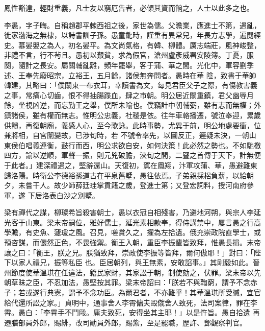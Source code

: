 \begin{pinyinscope}
 鳳性豁達，輕財重義，凡士友以窮厄告者，必傾其資而餉之，人士以此多之也。



 李愚，字子晦。自稱趙郡平棘西祖之後，家世為儒。父瞻業，應進士不第，遇亂，徙家渤海之無棣，以詩書訓子孫。愚童齔時，謹重有異常兒，年長方志學，遍閱經史。慕晏嬰之為人，初名晏平。為文尚氣格，有韓、柳體。厲志端莊，風神峻整，非禮不言，行不茍且。愚初以艱貧，求為假官，滄州盧彥威署安陵簿。丁憂，服闋，隨計之長安。屬關輔亂離，頻年罷舉，客于蒲、華之間。光化中，軍容劉季述、王奉先廢昭宗，立裕王，五月餘，諸侯無奔問者。愚時在華
 陰，致書于華帥韓建，其略曰：「僕關東一布衣耳，幸讀書為文，每見君臣父子之際，有傷教害義之事，常痛心切齒，恨不得抽腸蹀血，肆之市朝。明公居近關重鎮，君父幽辱月餘，坐視凶逆，而忘勤王之舉，僕所未喻也。僕竊計中朝輔弼，雖有志而無權；外鎮諸侯，雖有權而無志。惟明公忠義，社稷是依。往年車輅播遷，號泣奉迎，累歲供饋，再復朝廟，義感人心，至今歌詠。此時事勢，尤異于前，明公地處要衝，位兼將相，自宮闈變故，已涉旬時，若
 不號令率先，以圖反正，遲疑未決，一朝山東侯伯唱義連衡，鼓行而西，明公求欲自安，如何決策！此必然之勢也。不如馳檄四方，諭以逆順，軍聲一振，則元兇破膽，浹旬之間，二豎之首傳于天下，計無便于此者。」建深禮遇之，堅辭還山。天復初，駕在鳳翔，汴軍攻蒲、華，愚避難東歸洛陽。時衛公李德裕孫道古在平泉舊墅，愚往依焉。子弟親採梠負薪，以給朝夕，未嘗干人。故少師薛廷珪掌貢籍之歲，登進士第；又登宏詞料，授河南府參軍，遂
 下居洛表白沙之別墅。



 梁有禪代之謀，柳璨希旨殺害朝士，愚以衣冠自相殘害，乃避地河朔，與宗人李延光客于山東。梁末帝嗣位，雅好儒士，延光素相款奉，得侍講禁中，屢言愚之行高學贍，有史魚、蘧瑗之風。召見，嗟賞久之，擢為左拾遺。俄充崇政院直學士，或預咨謀，而儼然正色，不畏強禦。衡王入朝，重臣李振輩皆致拜，惟愚長揖。末帝讓之曰：「衡王，朕之兄。朕猶致拜，崇政使李振等皆拜，爾何傲耶！」對曰：「陛下以家人禮兄，振等私臣
 也。臣居朝列，與王無素，安敢諂事。」其剛毅如此。晉州節度使華溫琪在任違法，籍民家財，其家訟于朝，制使劾之，伏罪。梁末帝以先朝草昧之臣，不忍加法，愚堅按其罪。梁末帝詔曰：「朕若不與鞫窮，謂予不念赤子；若或遂行典憲，謂予不念功臣。為爾君者，不亦難乎！其華溫琪所受贓，宜官給代還所訟之家。」貞明中，通事舍人李霄傭夫毆僦舍人致死，法司案律，罪在李霄。愚白：「李霄手不鬥毆。庸夫致死，安得坐其主耶！」以是忤旨。愚自拾遺
 再遷膳部員外郎，賜緋，改司勛員外郎，賜紫，至是罷職，歷許、鄧觀察判官。




\end{pinyinscope}
